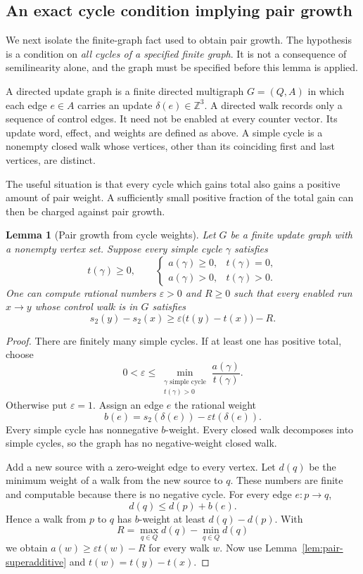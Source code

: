 \documentclass[11pt,a4paper]{article}
\newtheorem{lemma}[theorem]{Lemma}
\theoremstyle{definition}
\theoremstyle{remark}
\newcommand{\Z}{\mathbb Z}
\begin{document}
\subsection{An exact cycle condition implying pair growth}

We next isolate the finite-graph fact used to obtain pair growth.
The hypothesis is a condition on \emph{all cycles of a specified finite
graph}. It is not a consequence of semilinearity alone, and the graph
must be specified before this lemma is applied.

A directed update graph is a finite directed multigraph \(G=(Q,A)\)
in which each edge \(e\in A\) carries an update
\(\delta(e)\in\Z^3\). A directed walk records only a sequence of control
edges. It need not be enabled at every counter vector. Its update
word, effect, and weights are defined as above.
A simple cycle is a nonempty closed walk whose vertices, other than
its coinciding first and last vertices, are distinct.

The useful situation is that every cycle which gains total also gains
a positive amount of pair weight. A sufficiently small positive
fraction of the total gain can then be charged against pair growth.

\begin{lemma}[Pair growth from cycle weights]\label{lem:cycle-pair-growth}
Let \(G\) be a finite update graph with a nonempty vertex set. Suppose every simple cycle
\(\gamma\) satisfies
\[
 t(\gamma)\ge0,\qquad
 \begin{cases}
 a(\gamma)\ge0,&t(\gamma)=0,\\
 a(\gamma)>0,&t(\gamma)>0.
 \end{cases}
\]
One can compute rational numbers \(\varepsilon>0\) and \(R\ge0\)
such that every enabled run \(x\longrightarrow y\) whose control walk
is in \(G\) satisfies
\begin{equation}
 s_2(y)-s_2(x)
   \ge \varepsilon\bigl(t(y)-t(x)\bigr)-R.
 \label{eq:rigorous-pair-growth}
\end{equation}
\end{lemma}
\begin{proof}
There are finitely many simple cycles. If at least one has positive
total, choose
\[
 0<\varepsilon\le
 \min_{\substack{\gamma\text{ simple cycle}\\t(\gamma)>0}}
       \frac{a(\gamma)}{t(\gamma)}.
\]
Otherwise put \(\varepsilon=1\).
Assign an edge \(e\) the rational weight
\[
 b(e)=s_2(\delta(e))-\varepsilon t(\delta(e)).
\]
Every simple cycle has nonnegative \(b\)-weight. Every closed walk
decomposes into simple cycles, so the graph has no negative-weight
closed walk.

Add a new source with a zero-weight edge to every vertex. Let \(d(q)\)
be the minimum weight of a walk from the new source to \(q\).
These numbers are finite and computable because there is no negative
cycle. For every edge \(e:p\to q\),
\[
 d(q)\le d(p)+b(e).
\]
Hence a walk from \(p\) to \(q\) has \(b\)-weight at least
\(d(q)-d(p)\). With
\[
 R=\max_{q\in Q}d(q)-\min_{q\in Q}d(q)
\]
we obtain \(a(w)\ge\varepsilon t(w)-R\) for every walk \(w\).
Now use Lemma~\ref{lem:pair-superadditive} and
\(t(w)=t(y)-t(x)\).
\end{proof}
\end{document}
